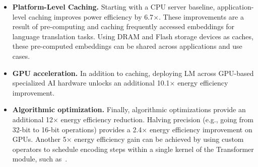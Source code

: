 \begin{itemize}
    \item \textbf{Platform-Level Caching.} Starting with a CPU server baseline, application-level caching improves power efficiency by 6.7$\times$. These improvements are a result of pre-computing and caching frequently accessed embeddings for language translation tasks. Using DRAM and Flash storage devices as caches, these pre-computed embeddings can be shared across applications and use cases.
    \item \textbf{GPU acceleration.} In addition to caching, deploying LM across GPU-based specialized AI hardware unlocks an additional 10.1$\times$ energy efficiency improvement.

    \item \textbf{Algorithmic optimization.} Finally, algorithmic optimizations provide an additional 12$\times$ energy efficiency reduction. Halving precision (e.g., going from 32-bit to 16-bit operations) provides a 2.4$\times$ energy efficiency improvement on GPUs. Another 5$\times$ energy efficiency gain can be achieved by using custom operators to schedule encoding steps within a single kernel of the Transformer module, such as~\cite{faster-transformer}. 

\end{itemize}








